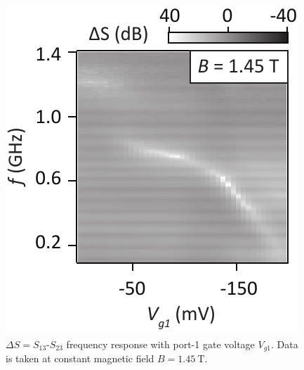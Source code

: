 \begin{figure}
\includegraphics[scale=0.7]{Sfig4_2.pdf}
\caption[Frequency response with gate voltage]{$\Delta S = S_{13}$-$S_{23}$ frequency response with port-1 gate voltage $V_{g1}$. Data is taken at constant magnetic field $B = \SI{1.45}{\tesla}$.}
\label{fig:qhe_s4}
\end{figure}